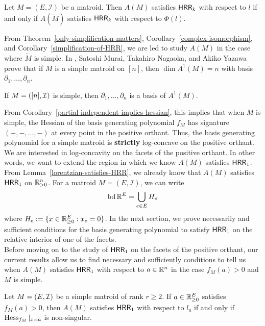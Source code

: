 \documentclass{puthesis-UG}
\begin{document}
\begin{cor} \label{simplification-of-HRR}
	Let $M = (E, \mathcal{I})$ be a matroid. Then $A(M)$ satisfies $\mathsf{HRR}_k$ with respect to $l$ if and only if $A(\widetilde{M})$ satisfies $\mathsf{HRR}_k$ with respect to $\Phi(l)$. 
\end{cor}

From Theorem~\ref{only-simplification-matters}, Corollary~\ref{complex-isomorphism}, and Corollary~\ref{simplification-of-HRR}, we are led to study $A(M)$ in the case where $\widetilde{M}$ is simple. In \cite{MNY}, Satoshi Murai, Takahiro Nagaoka, and Akiko Yazawa prove that if $M$ is a simple matroid on $[n]$, then $\dim A^1(M) = n$ with basis $\partial_1, \ldots, \partial_n$.

\begin{lem}  \label{simple-partial-independent}
	If $M = ([n], \mathcal{I})$ is simple, then $\partial_1, \ldots, \partial_n$ is a basis of $A^1(M)$.
\end{lem}

From Corollary~\ref{partial-independent-implies-hessian}, this implies that when $M$ is simple, the Hessian of the basis generating polynomial $f_M$ has signature $(+,-, \ldots, -)$ at every point in the positive orthant. Thus, the basis generating polynomial for a simple matroid is \textbf{strictly} log-concave on the positive orthant. We are interested in log-concavity on the facets of the positive orthant. In other words, we want to extend the region in which we know $A(M)$ satisfies $\mathsf{HRR}_1$. From Lemma~\ref{lorentzian-satisfies-HRR}, we already know that $A(M)$ satisfies $\mathsf{HRR}_1$ on $\mathbb{R}_{> 0}^n$. For a matroid $M = (E, \mathcal{I})$, we can write
\[	
	\operatorname{bd} \mathbb{R}^E = \bigcup_{e \in E} H_e
\]
where $H_e := \{x \in \mathbb{R}_{\geq 0}^E : x_e = 0 \}$. In the next section, we prove necessarily and sufficient conditions for the basis generating polynomial to satisfy $\mathsf{HRR}_1$ on the relative interior of one of the facets. \\

Before moving on to the study of $\mathsf{HRR}_1$ on the facets of the positive orthant, our current results allow us to find necessary and sufficiently conditions to tell us when $A(M)$ satisfies $\mathsf{HRR}_1$ with respect to $a \in \mathbb{R}^n$ in the case $f_M(a) > 0$ and $M$ is simple.

\begin{cor} \label{simple-matroids-HRR-condition}
	Let $M = (E, \mathcal{I})$ be a simple matroid of rank $r \geq 2$. If $a \in \mathbb{R}_{\geq 0}^E$ satisfies $f_M(a) > 0$, then $A(M)$ satisfies $\mathsf{HRR}_1$ with respect to $l_a$ if and only if $\operatorname{Hess}_{f_M} |_{x = a}$ is non-singular.
\end{cor} 
\end{document}
